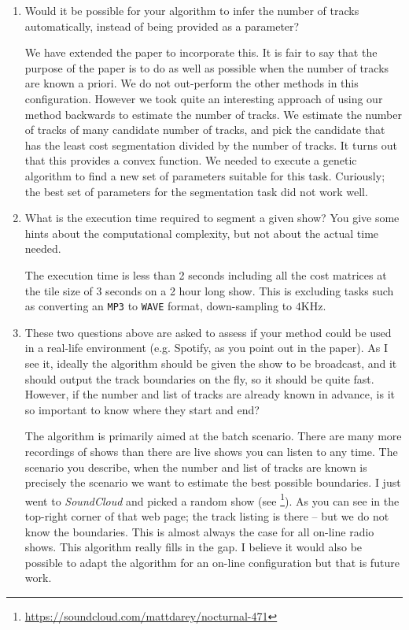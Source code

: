 \documentclass[12pt,a4paper,twoside,final,onecolumn]{article}
\begin{document}
\begin{enumerate}
\item Would it be possible for your algorithm to infer the number of tracks automatically, instead of being provided as a parameter?

{\color{blue}
	
	We have extended the paper to incorporate this. It is fair to say that the purpose of the paper is to do as well as possible when the number of tracks are known a priori. We do not out-perform the other methods in this configuration. However we took quite an interesting approach of using our method backwards to estimate the number of tracks. We estimate the number of tracks of many candidate number of tracks, and pick the candidate that has the least cost segmentation divided by the number of tracks. It turns out that this provides a convex function. We needed to execute a genetic algorithm to find a new set of parameters suitable for this task. Curiously; the best set of parameters for the segmentation task did not work well.
}

\item What is the execution time required to segment a given show? You give some hints about the computational complexity, but not about the actual time needed.

{\color{blue} The execution time is less than 2 seconds including all the cost matrices at the tile size of 3 seconds on a 2 hour long show. This is excluding tasks such as converting an \texttt{MP3} to \texttt{WAVE} format, down-sampling to $4$KHz. }

\item These two questions above are asked to assess if your method could be used in a real-life environment (e.g. Spotify, as you point out in the paper). As I see it, ideally the algorithm should be given the show to be broadcast, and it should output the track boundaries on the fly, so it should be quite fast. However, if the number and list of tracks are already known in advance, is it so important to know where they start and end?	

{\color{blue}
The algorithm is primarily aimed at the batch scenario. There are many more recordings of shows than there are live shows you can listen to any time. The scenario you describe, when the number and list of tracks are known is precisely the scenario we want to estimate the best possible boundaries. I just went to \textit{SoundCloud} and picked a random show  (see \footnote{\url{https://soundcloud.com/mattdarey/nocturnal-471}}). As you can see in the top-right corner of that web page; the track listing is there -- but we do not know the boundaries. This is almost always the case for all on-line radio shows. This algorithm really fills in the gap. I believe it would also be possible to adapt the algorithm for an on-line configuration but that is future work.
}


\end{enumerate}
\end{document}
